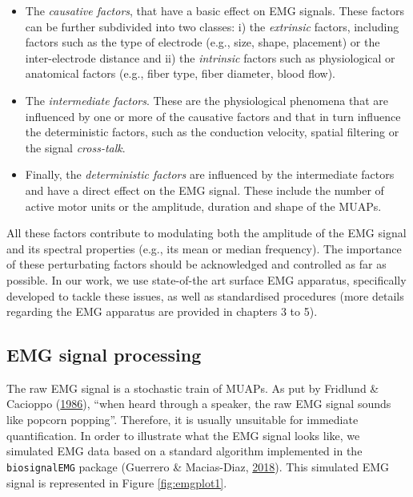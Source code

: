 \documentclass[a4paper,12pt,twoside,openright,oldfontcommands]{memoir}
\begin{document}
\begin{itemize}
\item
  The \emph{causative factors}, that have a basic effect on EMG signals. These factors can be further subdivided into two classes: i) the \emph{extrinsic} factors, including factors such as the type of electrode (e.g., size, shape, placement) or the inter-electrode distance and ii) the \emph{intrinsic} factors such as physiological or anatomical factors (e.g., fiber type, fiber diameter, blood flow).
\item
  The \emph{intermediate factors}. These are the physiological phenomena that are influenced by one or more of the causative factors and that in turn influence the deterministic factors, such as the conduction velocity, spatial filtering or the signal \emph{cross-talk}.
\item
  Finally, the \emph{deterministic factors} are influenced by the intermediate factors and have a direct effect on the EMG signal. These include the number of active motor units or the amplitude, duration and shape of the MUAPs.
\end{itemize}

All these factors contribute to modulating both the amplitude of the EMG signal and its spectral properties (e.g., its mean or median frequency). The importance of these perturbating factors should be acknowledged and controlled as far as possible. In our work, we use state-of-the art surface EMG apparatus, specifically developed to tackle these issues, as well as standardised procedures (more details regarding the EMG apparatus are provided in chapters 3 to 5).

\hypertarget{emg-signal-processing}{%
\subsection{EMG signal processing}\label{emg-signal-processing}}

The raw EMG signal is a stochastic train of MUAPs. As put by Fridlund \& Cacioppo (\protect\hyperlink{ref-fridlund_guidelines_1986}{1986}), \enquote{when heard through a speaker, the raw EMG signal sounds like popcorn popping}. Therefore, it is usually unsuitable for immediate quantification. In order to illustrate what the EMG signal looks like, we simulated EMG data based on a standard algorithm implemented in the \texttt{biosignalEMG} package (Guerrero \& Macias-Diaz, \protect\hyperlink{ref-R-biosignalEMG}{2018}). This simulated EMG signal is represented in Figure \ref{fig:emgplot1}.
\end{document}
